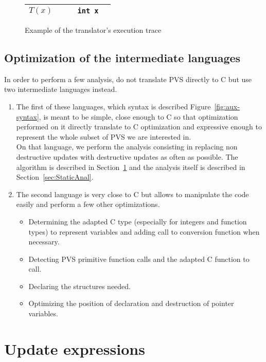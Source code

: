 \documentclass[12pt,a4paper]{article}
\newcommand{\cl}[1]{\texttt{#1}}
\begin{document}
\begin{figure}
\begin{tabular}{|p{3.2cm}|p{4.5cm}|p{3.9cm}|p{1.2cm}|p{2.6cm}|}
$T(x)$ & & & \cl{int x} & \\ \hline

\end{tabular}
\caption{Example of the translator's execution trace}
\label{fig:exTrans}
\end{figure}







\subsection{Optimization of the intermediate languages}

In order to perform a few analysis, do not translate PVS directly to C but use two intermediate languages instead.
\begin{enumerate}
\item The first of these languages, which syntax is described Figure~\ref{fig:aux-syntax}, is meant to be simple, close enough to C so that optimization performed on it directly translate to C optimization and expressive enough to represent the whole subset of PVS we are interested in. \\

On that language, we perform the analysis consisting in replacing non destructive updates with destructive updates as often as possible. The algorithm is described in Section~\ref{sec:UpdateExpr} and the analysis itself is described in Section~\ref{sec:StaticAnal}.

\item The second language is very close to C but allows to manipulate the code easily and perform a few other optimizations.
\begin{itemize}
\item Determining the adapted C type (especially for integers and function types) to represent variables and adding call to conversion function when necessary.
\item Detecting PVS primitive function calls and the adapted C function to call.
\item Declaring the structures needed.
\item Optimizing the position of declaration and destruction of pointer variables.
\end{itemize}
\end{enumerate}


\newpage
\section{Update expressions}
\label{sec:UpdateExpr}
\end{document}
